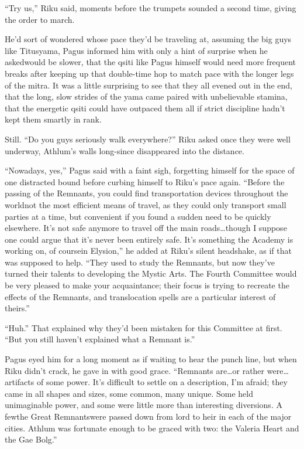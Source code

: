 ``Try us,'' Riku said, moments before the trumpets sounded a second time, giving the order to march.

He'd sort of wondered whose pace they'd be traveling at, assuming the big guys like Titus\textemdash yama, Pagus informed him with only a hint of surprise when he asked\textemdash would be slower, that the qsiti like Pagus himself would need more frequent breaks after keeping up that double-time hop to match pace with the longer legs of the mitra. It was a little surprising to see that they all evened out in the end, that the long, slow strides of the yama came paired with unbelievable stamina, that the energetic qsiti could have outpaced them all if strict discipline hadn't kept them smartly in rank.

Still. ``Do you guys seriously walk everywhere?'' Riku asked once they were well underway, Athlum's walls long-since disappeared into the distance.

``Nowadays, yes,'' Pagus said with a faint sigh, forgetting himself for the space of one distracted bound before curbing himself to Riku's pace again. ``Before the passing of the Remnants, you could find transportation devices throughout the world\textemdash not the most efficient means of travel, as they could only transport small parties at a time, but convenient if you found a sudden need to be quickly elsewhere. It's not safe anymore to travel off the main roads\ldots though I suppose one could argue that it's never been entirely safe. It's something the Academy is working on, of course\textemdash in Elysion,'' he added at Riku's silent headshake, as if that was supposed to help. ``They used to study the Remnants, but now they've turned their talents to developing the Mystic Arts. The Fourth Committee would be very pleased to make your acquaintance; their focus is trying to recreate the effects of the Remnants, and translocation spells are a particular interest of theirs.''

``Huh.'' That explained why they'd been mistaken for this Committee at first. ``But you still haven't explained what a Remnant is.''

Pagus eyed him for a long moment as if waiting to hear the punch line, but when Riku didn't crack, he gave in with good grace. ``Remnants are\ldots or rather were\ldots artifacts of some power. It's difficult to settle on a description, I'm afraid; they came in all shapes and sizes, some common, many unique. Some held unimaginable power, and some were little more than interesting diversions. A few\textemdash the Great Remnants\textemdash were passed down from lord to heir in each of the major cities. Athlum was fortunate enough to be graced with two: the Valeria Heart and the Gae Bolg.''

